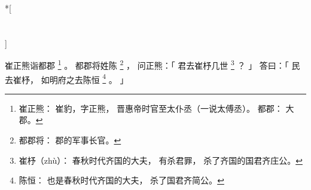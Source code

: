 
\switchcolumn[0]*[\section{}]

崔正熊诣都郡%
\footnote{%
    崔正熊：
        崔豹，字正熊，
        晋惠帝时官至太仆丞（一说太傅丞）。
    都郡：
        大郡。
}%
。
都郡将姓陈%
\footnote{%
    都郡将：
        郡的军事长官。
}%
，
问正熊：「
    君去崔杼几世%
    \footnote{%
        崔杼（zhù）：
            春秋时代齐国的大夫，
            有杀君罪，
            杀了齐国的国君齐庄公。
    }%
    ？
」
答曰：「
    民去崔杼，
    如明府之去陈恒%
    \footnote{%
        陈恒：
            也是春秋时代齐国的大夫，
            杀了国君齐简公。
    }%
    。
」

\switchcolumn


